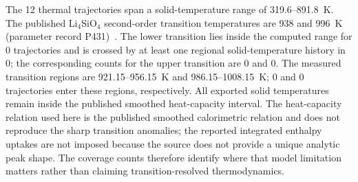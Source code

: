 The 12 thermal trajectories span a solid-temperature range of 319.6--891.8~K. The published Li$_4$SiO$_4$ second-order transition temperatures are 938 and 996~K (parameter record P431)~\cite{kleykamp1996enthalpy}. The lower transition lies inside the computed range for 0 trajectories and is crossed by at least one regional solid-temperature history in 0; the corresponding counts for the upper transition are 0 and 0. The measured transition regions are 921.15--956.15~K and 986.15--1008.15~K; 0 and 0 trajectories enter these regions, respectively. All exported solid temperatures remain inside the published smoothed heat-capacity interval. The heat-capacity relation used here is the published smoothed calorimetric relation and does not reproduce the sharp transition anomalies; the reported integrated enthalpy uptakes are not imposed because the source does not provide a unique analytic peak shape. The coverage counts therefore identify where that model limitation matters rather than claiming transition-resolved thermodynamics.

